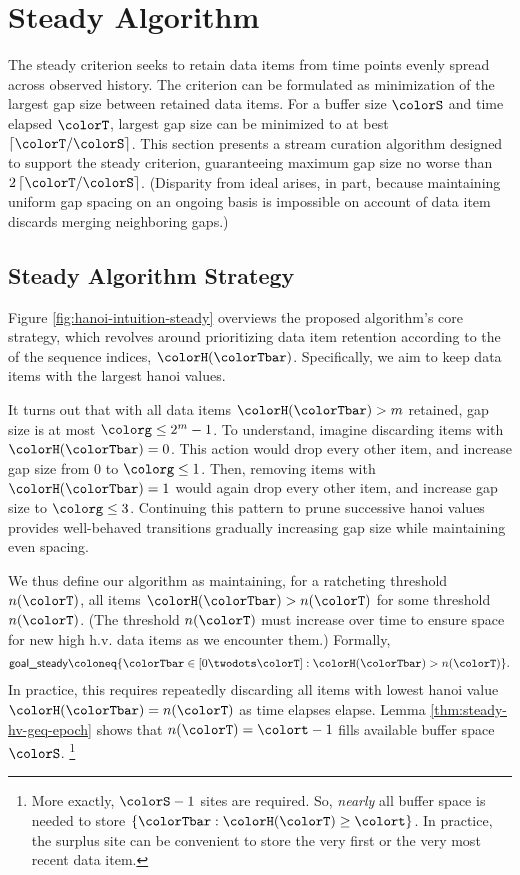 \section{Steady Algorithm} \label{sec:steady}

The steady criterion seeks to retain data items from time points evenly spread across observed history.
The criterion can be formulated as minimization of the largest gap size between retained data items.
For a buffer size $\colorS$ and time elapsed $\colorT$, largest gap size can be minimized to at best $\left\lceil \colorT / \colorS \right\rceil$.
This section presents a stream curation algorithm designed to support the steady criterion, guaranteeing maximum gap size no worse than $2\left\lceil \colorT / \colorS \right\rceil$.
(Disparity from ideal arises, in part, because maintaining uniform gap spacing on an ongoing basis is impossible on account of data item discards merging neighboring gaps.)

\subsection{Steady Algorithm Strategy}
\label{sec:steady-strategy}

Figure \ref{fig:hanoi-intuition-steady} overviews the proposed algorithm's core strategy, which revolves around prioritizing data item retention according to the \hv{} of the sequence indices, $\colorH(\colorTbar)$.
Specifically, we aim to keep data items with the largest hanoi values.

It turns out that with all data items $\colorH(\colorTbar) > m$ retained, gap size is at most $\colorg \leq 2^m - 1$.
To understand, imagine discarding items with $\colorH(\colorTbar) = 0$.
This action would drop every other item, and increase gap size from 0 to $\colorg \leq 1$.
Then, removing items with $\colorH(\colorTbar) = 1$ would again drop every other item, and increase gap size to $\colorg \leq 3$.
Continuing this pattern to prune successive hanoi values provides well-behaved transitions gradually increasing gap size while maintaining even spacing.

We thus define our algorithm as maintaining, for a ratcheting threshold $n(\colorT)$, all items $\colorH(\colorTbar) > n(\colorT)$ for some threshold $n(\colorT)$.
(The threshold $n(\colorT)$ must increase over time to ensure space for new high h.v. data items as we encounter them.)
Formally,
\begin{align*}
\textsf{goal\_steady}
\coloneq \{
\colorTbar \in [0 \twodots \colorT]
: \colorH(\colorTbar) > n(\colorT)
\}.
\end{align*}
In practice, this requires repeatedly discarding all items with lowest hanoi value $\colorH(\colorTbar) = n(\colorT)$ as time elapses elapse.
Lemma \ref{thm:steady-hv-geq-epoch} shows that $n(\colorT) = \colort - 1$ fills available buffer space $\colorS$.%
\footnote{%
More exactly, $\colorS - 1$ sites are required.
So, \textit{nearly} all buffer space is needed to store $\{\colorTbar : \colorH(\colorT) \geq \colort\}$.
In practice, the surplus site can be convenient to store the very first or the very most recent data item.
}

